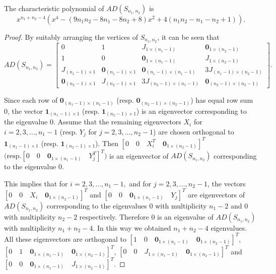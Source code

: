 \documentclass[10pt,a4paper]{amsart}
\begin{document}
	\begin{thm}
	The characteristic polynomial of $AD(S_{n_1,n_2})$ is 
		\[x^{n_1+n_2-4}\left(x^4-\left(9n_1n_2-8n_1-8n_2+8\right)x^2+4\left(n_1n_2-n_1-n_2+1\right)\right).\]
	\end{thm}

	\begin{proof}
	By suitably arranging the vertices of $S_{n_1,n_2}$, it can be seen that
		\[AD(S_{n_1,n_2})=\begin{bmatrix}
		0 & 1 & J_{1 \times (n_1-1)} & \bm{0}_{1 \times (n_2-1)}\\
		1 & 0 & \bm{0}_{1 \times (n_1 - 1)} & J_{1 \times (n_2 -1)}\\

		J_{(n_1 - 1) \times 1} & \bm{0}_{(n_1-1) \times 1} & \bm{0}_{(n_1-1) \times (n_1-1)} & 3J_{(n_1-1) \times (n_2-1)}\\
		\bm{0}_{(n_2-1) \times 1} & J_{(n_2-1) \times 1} & 3J_{(n_2-1) \times (n_1-1)} & \bm{0}_{(n_2-1) \times (n_2-1)}
		\end{bmatrix}.\]
		

		
		Since each row of $\bm{0}_{(n_1-1) \times (n_1-1)}$ (resp. $\bm{0}_{(n_2-1) \times (n_2-1)}$) has equal row sum $0$, the vector $\bm{1}_{(n_1-1) \times 1}$ (resp. $\bm{1}_{(n_2-1) \times 1}$) is an eigenvector corresponding to the eigenvalue $0$. Assume that the remaining eigenvectors $X_i$ for $i=2,3,\dots,n_1-1$ (resp. $Y_j$ for $j=2,3,\dots,n_2-1$) are chosen orthogonal to $\bm{1}_{(n_1-1) \times 1}$ (resp. $\bm{1}_{(n_2-1) \times 1}$). 
		Then $ \left[
		0 \quad 0 \quad X^T_i \quad \bm{0}_{1 \times (n_2-1)}
		\right]^T$ 
		$\big(\text{resp.} \left[
			0 \quad  0 \quad \bm{0}_{1 \times (n_1-1)} \quad Y^T_j
		\right]^T\big)$
       is an eigenvector of $AD(S_{n_1,n_2})$ corresponding to the eigenvalue $0$.
			
		
		This implies that for $i=2,3,\dots,n_1-1,$ and for $j=2,3,\dots,n_2-1$, the vectors
		$\left[
		0 \quad 0 \quad X_i \quad \bm{0}_{1 \times (n_2-1)}
		\right]^T$ and 
		$\left[
	 0 \quad 0 \quad \bm{0}_{1 \times (n_1-1)} \quad Y_j
	 \right]^T$ are eigenvectors of $AD(S_{n_1,n_2})$ corresponding to the eigenvalues $0$ with multiplicity $n_1-2$ and $0$ with multiplicity $n_2-2$ respectively. Therefore $0$ is an eigenvalue of $AD(S_{n_1,n_2})$ with multiplicity $n_1+n_2-4$. In this way we obtained $n_1+n_2-4$ eigenvalues. 		  
	 All these eigenvectors are orthogonal to $\left[
	 1 \quad 0 \quad \bm{0}_{1 \times (n_1-1)} \quad \bm{0}_{1 \times (n_2-1)}
	 \right]^T$,
	 $\left[
	 0 \quad 1 \quad \bm{0}_{1 \times (n_1-1)} \quad \bm{0}_{1 \times (n_2-1)}
	\right]^T$,
	  $\left[
	 0 \quad 0 \quad J_{1 \times (n_1-1)} \quad \bm{0}_{1 \times (n_2-1)}
	\right]^T$ 	 	 and 	 	 $\left[
	 	0 \quad 0 \quad \bm{0}_{1 \times (n_1-1)} \quad J_{1 \times (n_2-1)}
	\right]^T$. 
	 

\end{proof}
\end{document}
